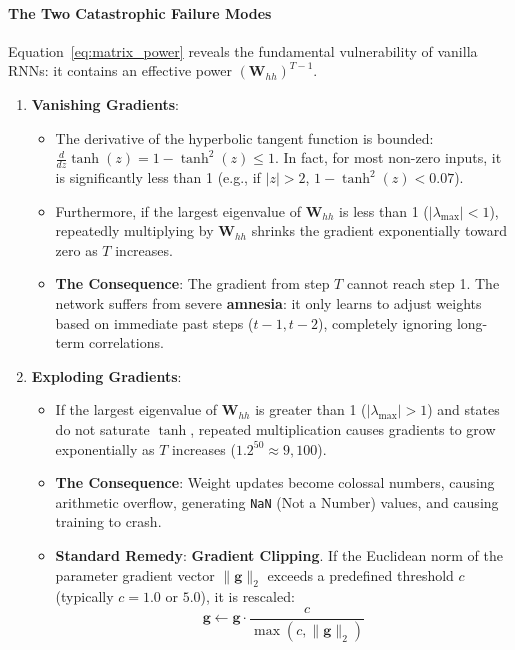 \paragraph{The Two Catastrophic Failure Modes}
Equation~\eqref{eq:matrix_power} reveals the fundamental vulnerability of vanilla RNNs: it contains an effective power $(\mathbf{W}_{hh})^{T-1}$.
\begin{enumerate}
    \item \textbf{Vanishing Gradients}:
    \begin{itemize}
        \item The derivative of the hyperbolic tangent function is bounded: $\frac{d}{dz}\tanh(z) = 1 - \tanh^2(z) \le 1$. In fact, for most non-zero inputs, it is significantly less than 1 (e.g., if $|z| > 2$, $1 - \tanh^2(z) < 0.07$).
        \item Furthermore, if the largest eigenvalue of $\mathbf{W}_{hh}$ is less than 1 ($|\lambda_{\max}| < 1$), repeatedly multiplying by $\mathbf{W}_{hh}$ shrinks the gradient exponentially toward zero as $T$ increases.
        \item \textbf{The Consequence}: The gradient from step $T$ cannot reach step 1. The network suffers from severe \textbf{amnesia}: it only learns to adjust weights based on immediate past steps ($t-1, t-2$), completely ignoring long-term correlations.
    \end{itemize}
    \item \textbf{Exploding Gradients}:
    \begin{itemize}
        \item If the largest eigenvalue of $\mathbf{W}_{hh}$ is greater than 1 ($|\lambda_{\max}| > 1$) and states do not saturate $\tanh$, repeated multiplication causes gradients to grow exponentially as $T$ increases ($1.2^{50} \approx 9{,}100$).
        \item \textbf{The Consequence}: Weight updates become colossal numbers, causing arithmetic overflow, generating \texttt{NaN} (Not a Number) values, and causing training to crash.
        \item \textbf{Standard Remedy}: \textbf{Gradient Clipping}. If the Euclidean norm of the parameter gradient vector $\|\mathbf{g}\|_2$ exceeds a predefined threshold $c$ (typically $c = 1.0$ or $5.0$), it is rescaled:
        \begin{equation}
        \mathbf{g} \longleftarrow \mathbf{g} \cdot \frac{c}{\max(c, \|\mathbf{g}\|_2)}\label{eq:grad_clipping}
        \end{equation}
    \end{itemize}
\end{enumerate}

